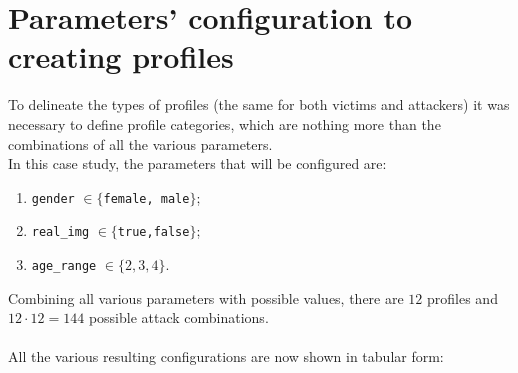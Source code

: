 \section{Parameters' configuration to creating profiles}
\label{cap:table-configuration}
To delineate the types of profiles (the same for both victims and attackers) it was necessary to define profile categories, which are nothing more than the combinations of all the various parameters.\\
In this case study, the parameters that will be configured are:
\begin{enumerate}
	\item \texttt{gender} $ \in \{$\texttt{female, male}$\}$;
	\item \texttt{real\_img} $ \in \{$\texttt{true,false}$\}$;
	\item \texttt{age\_range} $ \in \{2,3,4\}$.
\end{enumerate}
Combining all various parameters with possible values, there are $12$ profiles and $12 \cdot 12 = 144$ possible attack combinations.
\\\\All the various resulting configurations are now shown in tabular form:
